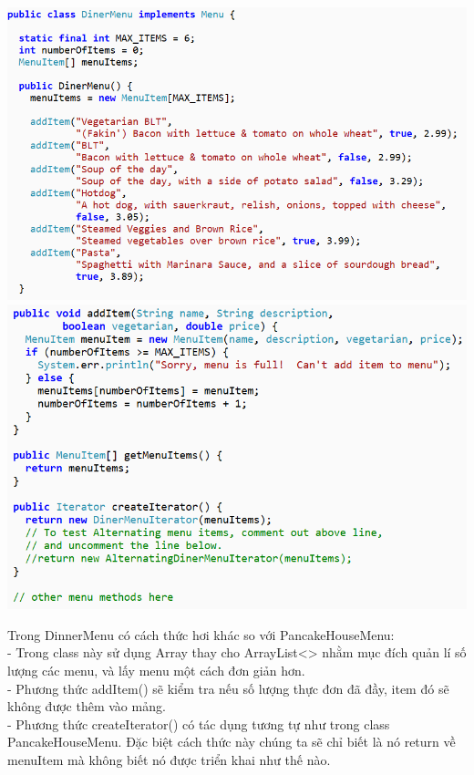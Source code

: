 \begin{center}
	\includegraphics[width=1\columnwidth,height=0.48\textheight]{GALLEYS/images/chapter3/images5}\\
	\includegraphics[width=1\columnwidth,height=0.48\textheight]{GALLEYS/images/chapter3/images6}\\
\end{center}
Trong DinnerMenu có cách thức hơi khác so với PancakeHouseMenu:\\
- Trong class này sử dụng Array thay cho ArrayList<> nhằm mục đích quản lí số lượng các menu, và lấy menu một cách đơn giản hơn.\\
- Phương thức addItem() sẽ kiểm tra nếu số lượng thực đơn đã đầy, item đó sẽ không được thêm vào mảng.\\
- Phương thức createIterator() có tác dụng tương tự như trong class PancakeHouseMenu. Đặc biệt cách thức này chúng ta sẽ chỉ biết là nó return về menuItem mà không biết nó được triển khai như thế nào.\\

